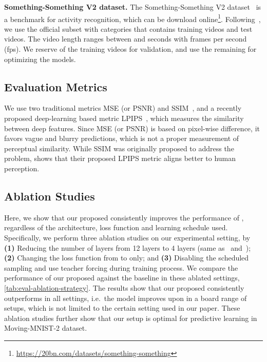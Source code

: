 \textbf{Something-Something V2 dataset.}
The Something-Something V2 dataset~\citep{goyal2017something} is a benchmark for activity recognition, which can be download online\footnote{\url{https://20bn.com/datasets/something-something}}. Following~\citet{wang2018eidetic}, we use the official subset with  categories that contains  training videos and  test videos. The video length ranges between  and  seconds with  frames per second (fps). We reserve  of the training videos for validation, and use the remaining  for optimizing the models.


\subsection{Evaluation Metrics}
\label{app-sub:metric}

We use two traditional metrics MSE (or PSNR) and SSIM~\citep{wang2004image}, and a recently proposed deep-learning based metric LPIPS~\citep{zhang2018unreasonable}, which measures the similarity between deep features.
Since MSE (or PSNR) is based on pixel-wise difference, it favors vague and blurry predictions, which is not a proper measurement of perceptual similarity.
While SSIM was originally proposed to address the problem, \citet{zhang2018unreasonable} shows that their proposed LPIPS metric aligns better to human perception. 


\subsection{Ablation Studies}
\label{app-sub:ablation}

Here, we show that our proposed {\ConvTTLSTM} consistently improves the performance of {\ConvLSTM}, regardless of the architecture, loss function and learning schedule used.
Specifically, we perform three ablation studies on our experimental setting, by \textbf{(1)} Reducing the number of layers from 12 layers to 4 layers (same as~\cite{xingjian2015convolutional} and~\cite{wang2018predrnnpp}); \textbf{(2)} Changing the loss function from  to  only; and \textbf{(3)} Disabling the scheduled sampling and use teacher forcing during training process.
We compare the performance of our proposed {\ConvTTLSTM} against the {\ConvLSTM} baseline in these ablated settings, \autoref{tab:eval-ablation-strategy}.
The results show that our proposed {\ConvTTLSTM} consistently outperforms {\ConvLSTM} in all settings, i.e.\ the {\ConvTTLSTM} model improves upon {\ConvLSTM} in a board range of setups, which is not limited to the certain setting used in our paper. These ablation studies further show that our setup is optimal for predictive learning in Moving-MNIST-2 dataset.

